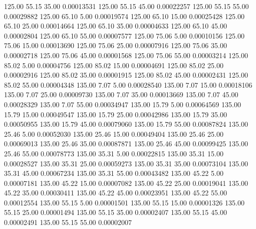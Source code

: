     125.00     55.15     35.00     0.00013531
    125.00     55.15     45.00     0.00022257
    125.00     55.15     55.00     0.00029882
    125.00     65.10      5.00     0.00019574
    125.00     65.10     15.00     0.00025428
    125.00     65.10     25.00     0.00014664
    125.00     65.10     35.00     0.00004633
    125.00     65.10     45.00     0.00002804
    125.00     65.10     55.00     0.00007577
    125.00     75.06      5.00     0.00010156
    125.00     75.06     15.00     0.00013690
    125.00     75.06     25.00     0.00007916
    125.00     75.06     35.00     0.00002718
    125.00     75.06     45.00     0.00001568
    125.00     75.06     55.00     0.00003214
    125.00     85.02      5.00     0.00004756
    125.00     85.02     15.00     0.00004691
    125.00     85.02     25.00     0.00002916
    125.00     85.02     35.00     0.00001915
    125.00     85.02     45.00     0.00002431
    125.00     85.02     55.00     0.00004348
    135.00      7.07      5.00     0.00028540
    135.00      7.07     15.00     0.00018106
    135.00      7.07     25.00     0.00009730
    135.00      7.07     35.00     0.00013669
    135.00      7.07     45.00     0.00028329
    135.00      7.07     55.00     0.00034947
    135.00     15.79      5.00     0.00064569
    135.00     15.79     15.00     0.00049547
    135.00     15.79     25.00     0.00042986
    135.00     15.79     35.00     0.00050955
    135.00     15.79     45.00     0.00079060
    135.00     15.79     55.00     0.00087824
    135.00     25.46      5.00     0.00052030
    135.00     25.46     15.00     0.00049404
    135.00     25.46     25.00     0.00069013
    135.00     25.46     35.00     0.00087871
    135.00     25.46     45.00     0.00099425
    135.00     25.46     55.00     0.00078773
    135.00     35.31      5.00     0.00022815
    135.00     35.31     15.00     0.00028527
    135.00     35.31     25.00     0.00059273
    135.00     35.31     35.00     0.00073104
    135.00     35.31     45.00     0.00067234
    135.00     35.31     55.00     0.00043482
    135.00     45.22      5.00     0.00007181
    135.00     45.22     15.00     0.00007082
    135.00     45.22     25.00     0.00019041
    135.00     45.22     35.00     0.00030411
    135.00     45.22     45.00     0.00023951
    135.00     45.22     55.00     0.00012554
    135.00     55.15      5.00     0.00001501
    135.00     55.15     15.00     0.00001326
    135.00     55.15     25.00     0.00001494
    135.00     55.15     35.00     0.00002407
    135.00     55.15     45.00     0.00002491
    135.00     55.15     55.00     0.00002007
